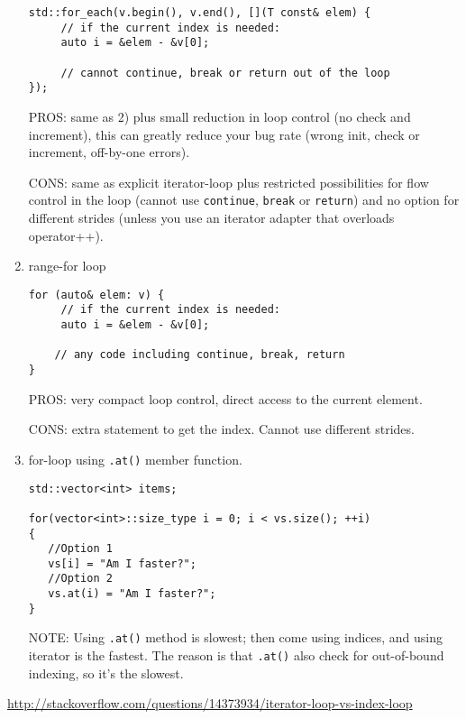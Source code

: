 \begin{enumerate}
\begin{verbatim}
std::for_each(v.begin(), v.end(), [](T const& elem) {
     // if the current index is needed:
     auto i = &elem - &v[0];

     // cannot continue, break or return out of the loop
});
\end{verbatim}

PROS: same as 2) plus small reduction in loop control (no check and increment),
this can greatly reduce your bug rate (wrong init, check or increment,
off-by-one errors).

CONS: same as explicit iterator-loop plus restricted possibilities for flow
control in the loop (cannot use \verb!continue!, \verb!break! or \verb!return!)
and no option for different strides (unless you use an iterator adapter that
overloads operator++).


  \item range-for loop
  
\begin{verbatim}
for (auto& elem: v) {
     // if the current index is needed:
     auto i = &elem - &v[0];

    // any code including continue, break, return
}
\end{verbatim}  
 
PROS: very compact loop control, direct access to the current element.

CONS: extra statement to get the index. Cannot use different strides.
 
  \item for-loop using \verb!.at()! member function.

\begin{lstlisting}
std::vector<int> items;

for(vector<int>::size_type i = 0; i < vs.size(); ++i)
{
   //Option 1
   vs[i] = "Am I faster?";
   //Option 2
   vs.at(i) = "Am I faster?";
}

\end{lstlisting}
NOTE: Using \verb!.at()! method is slowest; then come using indices, and using
iterator is the fastest. The reason is that \verb!.at()! also check for
out-of-bound indexing, so it's the slowest.

\end{enumerate}
\url{http://stackoverflow.com/questions/14373934/iterator-loop-vs-index-loop}
% 
% 
% 

